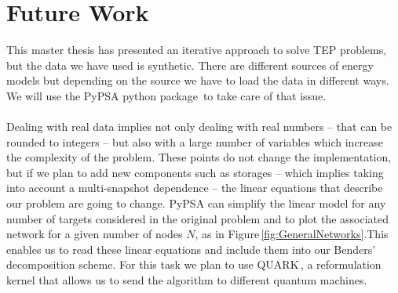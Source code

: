 \section{Future Work}
This master thesis has presented an iterative approach to solve TEP problems, but the data we have used is synthetic. There are different sources of energy models but depending on the source we have to load the data in different ways. We will use the PyPSA python package\,\cite{PyPSA-Eur:PyPSA-Eur} to take care of that issue.\\\\
Dealing with real data implies not only dealing with real numbers -- that can be rounded to integers -- but also with a large number of variables which increase the complexity of the problem. These points do not change the implementation, but if we plan to add new components such as storages -- which implies taking into account a multi-snapshot dependence -- the linear equations that describe our problem are going to change. PyPSA can simplify the linear model for any number of targets considered in the original problem and to plot the associated network for a given number of nodes $N$, as in Figure\,\ref{fig:GeneralNetworks}.This enables us to read these linear equations and include them into our Benders' decomposition scheme. For this task we plan to use QUARK\,\cite{dlrsc2023quark}, a reformulation kernel that allows us to send the algorithm to different quantum machines.
